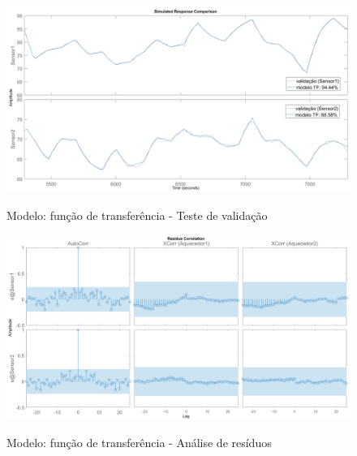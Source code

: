 \begin{figure}[h]
	\caption{Modelo: função de transferência - Teste de validação}
	\begin{center}
		\includegraphics[width=1.00\textwidth]{./5_images/tclabsp-models-TF-compare.png} 
		\label{fig:tclabsp-models-tf-compare}
	\end{center}
	\centering
\end{figure}

\begin{figure}[h]
	\caption{Modelo: função de transferência - Análise de resíduos}
	\begin{center}
		\includegraphics[width=1.00\textwidth]{./5_images/tclabsp-models-TF-resid.png} 
		\label{fig:tclabsp-models-tf-resid}
	\end{center}
	\centering
\end{figure}

